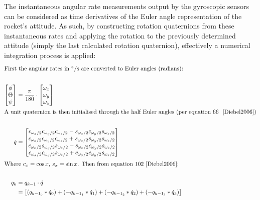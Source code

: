 The instantaneous angular rate measurements output by the gyroscopic sensors can be considered as time derivatives of the Euler angle representation of the rocket's attitude. As such, by constructing rotation quaternions from these instantaneous rates and applying the rotation to the previously determined attitude (simply the last calculated rotation quaternion), effectively a numerical integration process is applied:\\[0.5em]
{
\setlength{\belowdisplayskip}{5pt}%
\setlength{\abovedisplayskip}{-15pt}%
\begin{align*}
  \intertext{First the angular rates in $\unit{\degree}/\unit{\second}$ are converted to Euler angles (radians):}\\
  \begin{bmatrix}
    \phi\\\Theta\\\psi
    \end{bmatrix} &= \frac{\pi}{180}\cdot\begin{bmatrix}
                                        \omega_x\\\omega_y\\\omega_z
                                        \end{bmatrix}\\
    \intertext{A unit quaternion is then initialised through the half Euler angles (per equation 66 ~\cite{Diebel2006})}\\
    \dot q &= 
    \begin{bmatrix}
      c_{\omega_x/2}c_{\omega_y/2}c_{\omega_z/2}-s_{\omega_x/2}c_{\omega_y/2}s_{\omega_z/2}\\
      c_{\omega_x/2}c_{\omega_y/2}c_{\omega_z/2}+s_{\omega_x/2}s_{\omega_y/2}s_{\omega_z/2}\\
      c_{\omega_x/2}s_{\omega_y/2}s_{\omega_z/2}-s_{\omega_x/2}c_{\omega_y/2}s_{\omega_z/2}\\
      c_{\omega_x/2}c_{\omega_y/2}s_{\omega_z/2}+c_{\omega_x/2}c_{\omega_y/2}s_{\omega_z/2}\\
    \end{bmatrix}\\[0.5ex]
    \intertext{Where $c_x=\cos{x}$, $s_x=\sin{x}$. Then from equation 102~\cite{Diebel2006}:}\\
    q_{k} &= q_{k-1}\cdot\dot q\\
          &= \begin{bmatrix}
            (q_{{k-1}_0} * \dot q_0) + (-q_{{k-1}_1} * \dot q_1) + (-q_{{k-1}_2} * \dot q_2) + (-q_{{k-1}_3} * \dot q_3)\\

\end{bmatrix}
\end{align*}}
